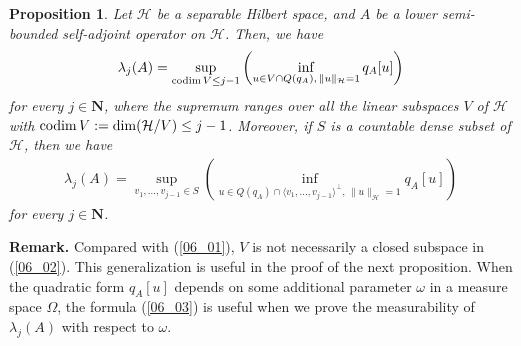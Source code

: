 \documentclass[12pt,a4paper]{article}
\newtheorem{proposition}[theorem]{Proposition}
\def\codim{\mathop{\rm codim}\nolimits}
\begin{document}
\begin{proposition}
 \label{proposition_min-max}
Let $\mathcal{H}$ be a separable Hilbert space,
and $A$ be a lower semi-bounded self-adjoint operator on $\mathcal{H}$.
Then, we have
\begin{align}
 \label{06_02}
\lambda_j(A)
=\sup_{\codim V\leq j-1}
\left(
\inf_{u\in V\cap Q(q_A),\, \|u\|_\mathcal{H}=1}q_A[u]
\right)
\end{align}
for every $j\in \mathbf{N}$,
where the supremum ranges over all the linear subspaces $V$ of $\mathcal{H}$
with $\codim V:=\dim(\mathcal{H}/V)\leq j-1$.
Moreover, if $S$ is a countable dense subset of $\mathcal{H}$,
then we have
\begin{align}
 \label{06_03}
\lambda_j(A)
=\sup_{v_1,...,v_{j-1}\in S}
\left(
\inf_{u\in Q(q_A)\cap 
\langle v_1,...,v_{j-1}\rangle^{\bot}
,\, \|u\|_\mathcal{H}=1}q_A[u]
\right)
\end{align}
for every $j\in \mathbf{N}$.
\end{proposition}
\noindent\textbf{Remark.}
Compared with 
(\ref{06_01}),
$V$ is not necessarily a closed subspace in (\ref{06_02}).
This generalization is useful in the proof of the next proposition.
When the quadratic form 
$q_A[u]$ depends on some additional parameter
$\omega$ in a measure space $\Omega$,
the formula
(\ref{06_03}) is useful when we prove the measurability
of $\lambda_j(A)$ with respect to $\omega$.
\end{document}
